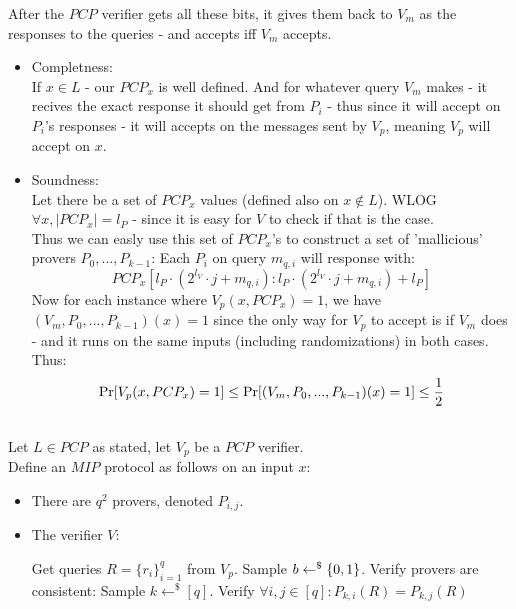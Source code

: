 After the $PCP$ verifier gets all these bits,
it gives them back to $V_m$ as the responses to the queries -
and accepts iff $V_m$ accepts.\\

\begin{itemize}
	\item Completness:\\
	If $x\in L$ - our $PCP_x$ is well defined.
	And for whatever query $V_m$ makes - it recives the exact
	response it should get from $P_i$ - thus since it will accept
	on $P_i$'s responses - it will accepts on the messages sent by $V_p$,
	meaning $V_p$ will accept on $x$.
	\item Soundness:\\
	Let there be a set of $PCP_x$ values (defined also on $x\notin L$).
	WLOG $\forall x,|PCP_x|=l_P$ - since it is easy for $V$ to check if that is the case.\\
	Thus we can easly use this set of $PCP_x$'s to
	construct a set of 'mallicious' provers $P_0,...,P_{k-1}$:
	Each $P_i$ on query $m_{q,i}$ will response with:
	\[
		PCP_x[l_P\cdot(2^{l_V}\cdot j+m_{q,i}):l_P\cdot(2^{l_V}\cdot j+m_{q,i})+l_P]
	\]
	Now for each instance where $V_p(x,PCP_x)=1$, we have
	$(V_m,P_0,...,P_{k-1})(x)=1$ since the only way for $V_p$
	to accept is if $V_m$ does - and it runs on the same inputs (including randomizations) in both cases.\\
	Thus:
	\[
		\operatorname*{Pr}[V_p(x,PCP_x)=1]\leq \operatorname*{Pr}[(V_m,P_0,...,P_{k-1})(x)=1]\leq\frac{1}{2}
	\] 
\end{itemize}

\subsection{}
Let $L\in PCP$ as stated, let $V_p$ be a $PCP$ verifier.\\
Define an $MIP$ protocol as follows on an input $x$:
\begin{itemize}
	\item There are $q^2$ provers, denoted $P_{i,j}$.
	\item The verifier $V$:\\
	\begin{algorithmic}
		\State Get queries $R=\{r_i\}_{i=1}^q$ from $V_p$.
		\State Sample $b\leftarrow^\$\{0,1\}$.
			\State Verify provers are consistent:
			\State Sample $k\leftarrow^\$[q]$.
			\State Verify $\forall i,j\in[q]:P_{k,i}(R)=P_{k,j}(R)$
		\Else
			\State 
		\EndIf 
	\end{algorithmic}
\end{itemize}


